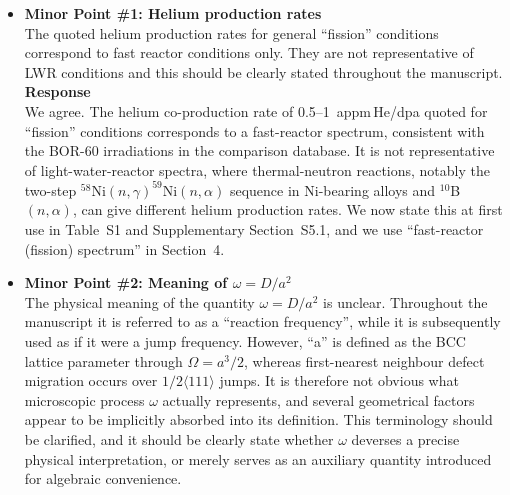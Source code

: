 \documentclass{article}
\newif\ifshowauthornotes
\newcommand{\authornote}[1]{\ifshowauthornotes{\color{red}\ [\textbf{Author action:} #1]}\fi}
\begin{document}
\begin{itemize}
\textbf{Response}\\
The reviewer's second interpretation is correct. The statement referred to the comparison between the reduced (bin-moment) and fully discrete simulations, not to the comparison with experiment, and we agree that the formulation was misleading. It has been removed from the Abstract and the Conclusions. The comparison between the reduced and discrete solutions is now reported separately and quantitatively in Section~4.4 and Supplementary Section~S6, for all six observables and with the one persistent residual identified. Following the reviewer's point about detailed distributions, the revised figures also show the complete size distributions of the production run (Figures~5, 7 and 8). The dose evolution of the observables along the verification ladder is compared with the exact solution in Figures~S3 and S4. The statements on agreement with experiment have been moderated as described in the response to Point~\#11.

\item \textbf{Minor Point \#1: Helium production rates}\\
The quoted helium production rates for general ``fission'' conditions correspond to fast reactor conditions only. They are not representative of LWR conditions and this should be clearly stated throughout the manuscript.\\

\textbf{Response}\\
We agree. The helium co-production rate of 0.5--1~appm\,He/dpa quoted for ``fission'' conditions corresponds to a fast-reactor spectrum, consistent with the BOR-60 irradiations in the comparison database. It is not representative of light-water-reactor spectra, where thermal-neutron reactions, notably the two-step $^{58}$Ni$(n,\gamma)^{59}$Ni$(n,\alpha)$ sequence in Ni-bearing alloys and $^{10}$B$(n,\alpha)$, can give different helium production rates. We now state this at first use in Table~S1 and Supplementary Section~S5.1, and we use ``fast-reactor (fission) spectrum'' in Section~4.

\authornote{The September 17 PDF still labels the columns ``Fission'' without qualification (Table~S1, S5.1 ``Under fission irradiation''). Add ``fast-reactor'' as described.}

\item \textbf{Minor Point \#2: Meaning of $\omega = D/a^2$}\\
The physical meaning of the quantity $\omega=D/a^2$ is unclear. Throughout the manuscript it is referred to as a ``reaction frequency'', while it is subsequently used as if it were a jump frequency. However, ``a'' is defined as the BCC lattice parameter through $\Omega=a^3/2$, whereas first-nearest neighbour defect migration occurs over $1/2\langle 111\rangle$ jumps. It is therefore not obvious what microscopic process $\omega$ actually represents, and several geometrical factors appear to be implicitly absorbed into its definition. This terminology should be clarified, and it should be clearly state whether $\omega$ deverses a precise physical interpretation, or merely serves as an auxiliary quantity introduced for algebraic convenience.\\


\end{itemize}
\end{document}

